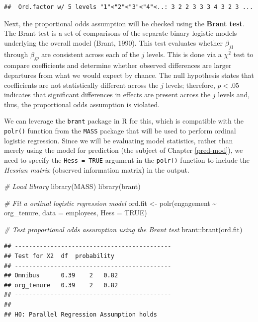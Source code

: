 \documentclass[
]{book}
\newenvironment{Shaded}{\begin{snugshade}}{\end{snugshade}}
\newcommand{\AttributeTok}[1]{\textcolor[rgb]{0.77,0.63,0.00}{#1}}
\newcommand{\CommentTok}[1]{\textcolor[rgb]{0.56,0.35,0.01}{\textit{#1}}}
\newcommand{\ConstantTok}[1]{\textcolor[rgb]{0.00,0.00,0.00}{#1}}
\newcommand{\FunctionTok}[1]{\textcolor[rgb]{0.00,0.00,0.00}{#1}}
\newcommand{\NormalTok}[1]{#1}
\newcommand{\OtherTok}[1]{\textcolor[rgb]{0.56,0.35,0.01}{#1}}
\newcommand{\SpecialCharTok}[1]{\textcolor[rgb]{0.00,0.00,0.00}{#1}}
\begin{document}
\begin{verbatim}
##  Ord.factor w/ 5 levels "1"<"2"<"3"<"4"<..: 3 2 2 3 3 3 4 3 2 3 ...
\end{verbatim}

Next, the proportional odds assumption will be checked using the \textbf{Brant test}. The Brant test is a set of comparisons of the separate binary logistic models underlying the overall model (Brant, 1990). This test evaluates whether \(\beta_{j1}\) through \(\beta_{jp}\) are consistent across each of the \(j\) levels. This is done via a \(\chi^2\) test to compare coefficients and determine whether observed differences are larger departures from what we would expect by chance. The null hypothesis states that coefficients are not statistically different across the \(j\) levels; therefore, \(p < .05\) indicates that significant differences in effects are present across the \(j\) levels and, thus, the proportional odds assumption is violated.

We can leverage the \texttt{brant} package in R for this, which is compatible with the \texttt{polr()} function from the \texttt{MASS} package that will be used to perform ordinal logistic regression. Since we will be evaluating model statistics, rather than merely using the model for prediction (the subject of Chapter \ref{pred-mod}), we need to specify the \texttt{Hess\ =\ TRUE} argument in the \texttt{polr()} function to include the \emph{Hessian matrix} (observed information matrix) in the output.

\begin{Shaded}
\begin{Highlighting}[]
\CommentTok{\# Load library}
\FunctionTok{library}\NormalTok{(MASS)}
\FunctionTok{library}\NormalTok{(brant)}

\CommentTok{\# Fit a ordinal logistic regression model}
\NormalTok{ord.fit }\OtherTok{\textless{}{-}} \FunctionTok{polr}\NormalTok{(engagement }\SpecialCharTok{\textasciitilde{}}\NormalTok{ org\_tenure, }\AttributeTok{data =}\NormalTok{ employees, }\AttributeTok{Hess =} \ConstantTok{TRUE}\NormalTok{)}

\CommentTok{\# Test proportional odds assumption using the Brant test}
\NormalTok{brant}\SpecialCharTok{::}\FunctionTok{brant}\NormalTok{(ord.fit)}
\end{Highlighting}
\end{Shaded}

\begin{verbatim}
## -------------------------------------------- 
## Test for X2  df  probability 
## -------------------------------------------- 
## Omnibus      0.39    2   0.82
## org_tenure   0.39    2   0.82
## -------------------------------------------- 
## 
## H0: Parallel Regression Assumption holds
\end{verbatim}
\end{document}
